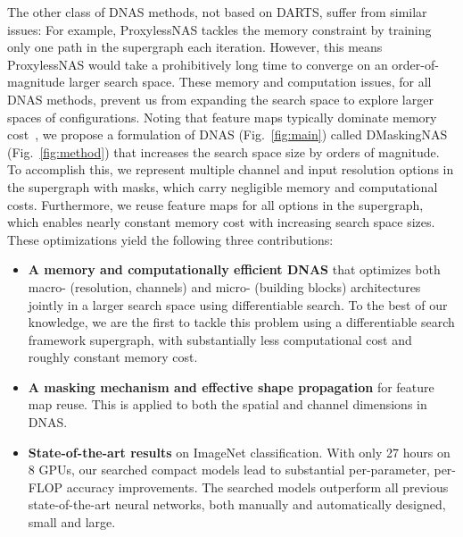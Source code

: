 \documentclass[10pt,twocolumn,letterpaper]{article}
\begin{document}
The other class of DNAS methods, not based on DARTS, suffer from similar issues: For example, ProxylessNAS tackles the memory constraint by training only one path in the supergraph each iteration. However, this means ProxylessNAS would take a prohibitively long time to converge on an order-of-magnitude larger search space. These memory and computation issues, for all DNAS methods, prevent us from expanding the search space to explore larger spaces of configurations. Noting that feature maps typically dominate memory cost~\cite{nvda_guide}, we propose a formulation of DNAS (Fig.~\ref{fig:main}) called DMaskingNAS (Fig.~\ref{fig:method}) that increases the search space size by orders of magnitude. To accomplish this, we represent multiple channel and input resolution options in the supergraph with masks, which carry negligible memory and computational costs. Furthermore, we reuse feature maps for all options in the supergraph, which enables nearly constant memory cost with increasing search space sizes. These optimizations yield the following three contributions:

\begin{itemize}
    \item \textbf{A memory and computationally efficient DNAS} that optimizes both macro- (resolution, channels) and micro- (building blocks) architectures jointly in a  larger search space using differentiable search. To the best of our knowledge, we are the first to tackle this problem using a differentiable search framework supergraph, with substantially less computational cost and roughly constant memory cost.
    \item \textbf{A masking mechanism and effective shape propagation} for feature map reuse. This is applied to both the spatial and channel dimensions in DNAS.
    \item \textbf{State-of-the-art results} on ImageNet classification. With only 27 hours on 8 GPUs, our searched compact models lead to substantial per-parameter, per-FLOP accuracy improvements. The searched models outperform all previous state-of-the-art neural networks, both manually and automatically designed, small and large.
\end{itemize}
\end{document}
